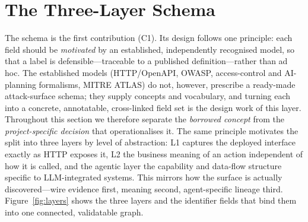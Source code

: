 \documentclass[11pt,a4paper]{article}
\begin{document}
\section{The Three-Layer Schema}\label{sec:schema}
The schema is the first contribution (C1). Its design follows one principle: each field
should be \emph{motivated} by an established, independently recognised model, so that a
label is defensible---traceable to a published definition---rather than ad hoc. The
established models (HTTP/OpenAPI, OWASP, access-control and AI-planning formalisms, MITRE
ATLAS) do not, however, prescribe a ready-made attack-surface schema; they supply concepts
and vocabulary, and turning each into a concrete, annotatable, cross-linked field set is the
design work of this layer. Throughout this section we therefore separate the \emph{borrowed
concept} from the \emph{project-specific decision} that operationalises it. The same
principle motivates the split into three layers by level of abstraction: L1 captures the
deployed interface exactly as HTTP exposes it, L2 the business meaning of an action
independent of how it is called, and the agentic layer the capability and data-flow
structure specific to LLM-integrated systems. This mirrors how the surface is actually
discovered---wire evidence first, meaning second, agent-specific lineage third.
Figure~\ref{fig:layers} shows the three layers and the identifier fields that bind them
into one connected, validatable graph.
\end{document}
